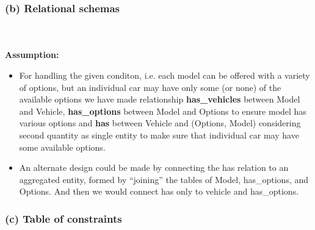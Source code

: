 \documentclass[12pt]{article}
\begin{document}
\newpage

\subsubsection*{(b) Relational schemas}
\vspace{3mm} \\
\vspace{5mm} \\
\textbf{Assumption:}
\begin{itemize}
    \item For handling the given conditon, i.e. each model can be offered with a variety of options, but an individual car may have only some (or none) of the available options we have made relationship \textbf{has\_vehicles} between Model and Vehicle, \textbf{has\_options} between Model and Options to ensure model has various options and \textbf{has} between Vehicle and (Options, Model) considering second quantity as single entity to make sure that individual car may have some available options.
    \item An alternate design could be made by connecting the has relation to an aggregated entity, formed by “joining” the tables of Model, has\_options, and Options. And then we would connect has only to vehicle and has\_options.
\end{itemize}

\newpage

\subsubsection*{(c) Table of constraints}
\end{document}
